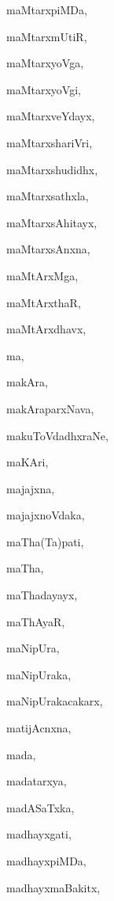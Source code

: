 \begin{multicols}{2}
{maMtarxpiMDa}, \pageref{maMtarxpiMDa}

{maMtarxmUtiR}, \pageref{maMtarxmUtiR}

{maMtarxyoVga}, \pageref{maMtarxyoVga}

{maMtarxyoVgi}, \pageref{maMtarxyoVgi}

{maMtarxveYdayx}, \pageref{maMtarxveYdayx}

{maMtarxshariVri}, \pageref{maMtarxshariVri}

{maMtarxshudidhx}, \pageref{maMtarxshudidhx}

{maMtarxsathxla}, \pageref{maMtarxsathxla}

{maMtarxsAhitayx}, \pageref{maMtarxsAhitayx}

{maMtarxsAnxna}, \pageref{maMtarxsAnxna}

{maMtArxMga}, \pageref{maMtArxMga}

{maMtArxthaR}, \pageref{maMtArxthaR}

{maMtArxdhavx}, \pageref{maMtArxdhavx}

{ma}, \pageref{ma}

{makAra}, \pageref{makAra}

{makAraparxNava}, \pageref{makAraparxNava}

{makuToVdadhxraNe}, \pageref{makuToVdadhxraNe}

{maKAri}, \pageref{maKAri}

{majajxna}, \pageref{majajxna}

{majajxnoVdaka}, \pageref{majajxnoVdaka}

{maTha(Ta)pati}, \pageref{maThaTapati}

{maTha}, \pageref{maTha}

{maThadayayx}, \pageref{maThadayayx}

{maThAyaR}, \pageref{maThAyaR}

{maNipUra}, \pageref{maNipUra}

{maNipUraka}, \pageref{maNipUraka}

{maNipUrakacakarx}, \pageref{maNipUrakacakarx}

{matijAcnxna}, \pageref{matijAcnxna}

{mada}, \pageref{mada}

{madatarxya}, \pageref{madatarxya}

{madASaTxka}, \pageref{madASaTxka}

{madhayxgati}, \pageref{madhayxgati}

{madhayxpiMDa}, \pageref{madhayxpiMDa}

{madhayxmaBakitx}, \pageref{madhayxmaBakitx}


\end{multicols}
